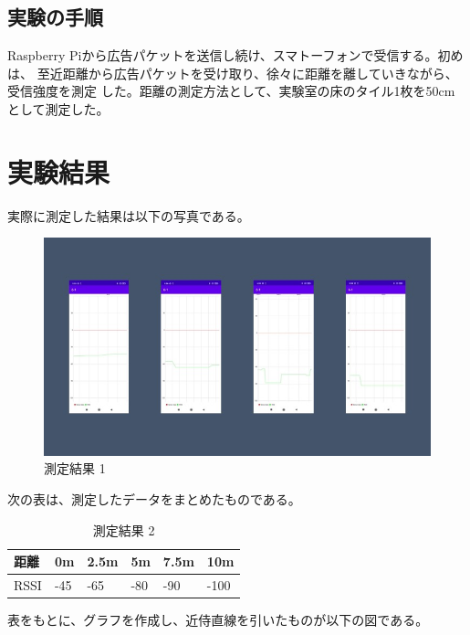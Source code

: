 \documentclass[dvipdfmx,autodetect-engine,titlepage]{jsarticle}
\begin{document}
\subsection{実験の手順}
Raspberry Piから広告パケットを送信し続け、スマトーフォンで受信する。初めは、
至近距離から広告パケットを受け取り、徐々に距離を離していきながら、受信強度を測定
した。距離の測定方法として、実験室の床のタイル1枚を50cmとして測定した。

\section{実験結果}
実際に測定した結果は以下の写真である。

\begin{figure}[h]
  \centering
  \includegraphics[scale=0.3]{pic4.jpg}
  \caption{測定結果 1}
\end{figure}

次の表は、測定したデータをまとめたものである。

\begin{table}[h]
  \centering
  \caption{測定結果 2}
  \begin{tabular}{|l||l|l|l|l|l|}
  \hline
  距離   & 0m  & 2.5m & 5m  & 7.5m & 10m  \\ \hline
  RSSI & -45 & -65  & -80 & -90  & -100 \\ \hline
  \end{tabular}
  \end{table}

  表をもとに、グラフを作成し、近侍直線を引いたものが以下の図である。 \\
\end{document}
